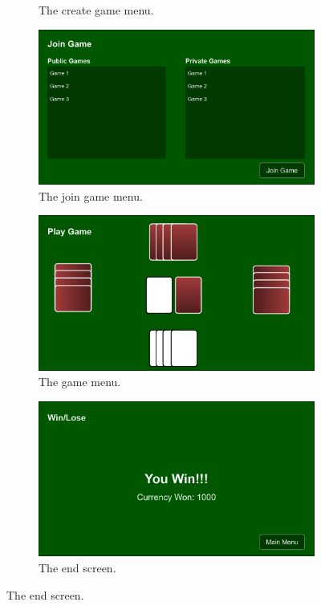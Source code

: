 \documentclass{article}
\begin{document}
\begin{figure}[h]
\begin{subfigure}{0.5\textwidth}
  \caption{\label{fig:create}The create game menu.}
\end{subfigure}%
\begin{subfigure}{0.5\textwidth}
  \centering
  \includegraphics[width=.99\linewidth]{Join.png}
  \caption{\label{fig:join}The join game menu.}
\end{subfigure}
\begin{subfigure}{0.5\textwidth}
  \centering
  \includegraphics[width=.99\linewidth]{Game.png}
  \caption{\label{fig:game}The game menu.}
\end{subfigure}%
\begin{subfigure}{0.5\textwidth}
  \centering
  \includegraphics[width=.99\linewidth]{End.png}
  \caption{\label{fig:end}The end screen.}
\end{subfigure}
\end{figure}
\end{document}
